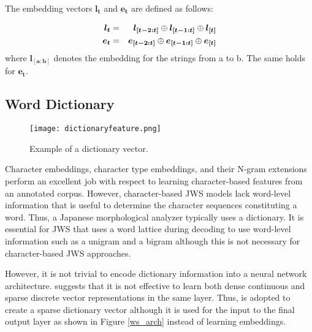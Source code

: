 \documentclass[11pt,letterpaper]{article}
\begin{document}
The embedding vectors $\bm{l_{t}}$ and $\bm{e_{t}}$ are defined as follows:

\begin{eqnarray}
\bm{l_{t}} &=& \bm{l_{[t-2:t]}} \oplus \bm{l_{[t-1:t]}} \oplus \bm{l_{[t]}} \\
\bm{e_{t}} &=& \bm{e_{[t-2:t]}} \oplus \bm{e_{[t-1:t]}} \oplus \bm{e_{[t]}} 
\vspace{6pt}
\end{eqnarray}
where $\bm{l_{[a:b]}}$ denotes the embedding for the strings from a to b. The same holds for $\bm{e_t}$.


\subsection{Word Dictionary}


\begin{figure*}[t]    
 \begin{center}    
 \texttt{[image: dictionaryfeature.png]}              
 \caption{Example of a dictionary vector.}    
 \label{dictionaryfeature}    
\end{center}    
\end{figure*}

Character embeddings, character type embeddings, and their N-gram extensions perform an excellent job with respect to learning character-based features from an annotated corpus. However, character-based JWS models lack word-level information that is useful to determine the character sequences constituting a word.
Thus, a Japanese morphological analyzer typically uses a dictionary.
It is essential for JWS that uses a word lattice during decoding to use word-level information such as a unigram and a bigram although this is not necessary for character-based JWS approaches.

However, it is not trivial to encode dictionary information into a neural network architecture.
{} suggests that it is not effective to learn both dense continuous and sparse discrete vector representations in the same layer. 
Thus,   is adopted to create a sparse dictionary vector although it is used for the input to the final output layer as shown in Figure \ref{ws_arch} instead of learning embeddings.
\end{document}

